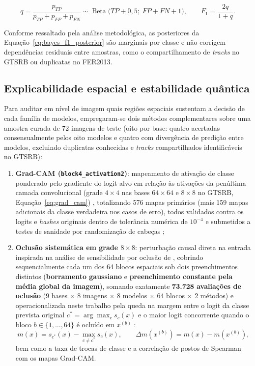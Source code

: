 \documentclass[
    12pt,
    openright,
    oneside,
    a4paper,
    english,
    brazil
]{abntex2}
\begin{document}
\begin{equation}
\label{eq:bayes_f1_posterior}
q = \frac{p_{TP}}{p_{TP} + p_{FP} + p_{FN}} \sim \operatorname{Beta}\bigl(TP + 0{,}5;\; FP + FN + 1\bigr),
\qquad
F_1 = \frac{2q}{1 + q}.
\end{equation}

Conforme ressaltado pela análise metodológica, as posteriores da Equação~\eqref{eq:bayes_f1_posterior} são marginais por classe e não corrigem dependências residuais entre amostras, como o compartilhamento de \textit{tracks} no GTSRB ou duplicatas no FER2013.

\subsection{Explicabilidade espacial e estabilidade quântica}

Para auditar em nível de imagem quais regiões espaciais sustentam a decisão de cada família de modelos, empregaram-se dois métodos complementares sobre uma amostra curada de 72 imagens de teste (oito por base: quatro acertadas consensualmente pelos oito modelos e quatro com divergência de predição entre modelos, excluindo duplicatas conhecidas e \textit{tracks} compartilhados identificáveis no GTSRB):
\begin{enumerate}
    \item \textbf{Grad-CAM (\texttt{block4\_activation2})}: mapeamento de ativação de classe ponderado pelo gradiente do logit-alvo em relação às ativações da penúltima camada convolucional (grade \(4 \times 4\) nas bases \(64 \times 64\) e \(8 \times 8\) no GTSRB, Equação~\eqref{eq:grad_cam}) \cite{selvaraju2020gradcam}, totalizando 576 mapas primários (mais 159 mapas adicionais da classe verdadeira nos casos de erro), todos validados contra os logits e \textit{hashes} originais dentro de tolerância numérica de \(10^{-4}\) e submetidos a testes de sanidade por randomização de cabeças \cite{adebayo2018sanity};
    \item \textbf{Oclusão sistemática em grade \(8 \times 8\)}: perturbação causal direta na entrada inspirada na análise de sensibilidade por oclusão de , cobrindo sequencialmente cada um dos 64 blocos espaciais sob dois preenchimentos distintos (\textbf{borramento gaussiano} e \textbf{preenchimento constante pela média global da imagem}), somando exatamente \textbf{73.728 avaliações de oclusão} (9 bases \(\times\) 8 imagens \(\times\) 8 modelos \(\times\) 64 blocos \(\times\) 2 métodos) e operacionalizada neste trabalho pela queda na margem entre o logit da classe prevista original \(c^* = \arg\max_c s_c(x)\) e o maior logit concorrente quando o bloco \(b \in \{1, \ldots, 64\}\) é ocluído em \(x^{(b)}\) \cite{zeiler2014visualizing}:
    \begin{equation}
    \label{eq:queda_margem_oclusao}
    m(x) = s_{c^*}(x) - \max_{c \neq c^*} s_c(x),
    \qquad
    \Delta m\!\left(x^{(b)}\right) = m(x) - m\!\left(x^{(b)}\right),
    \end{equation}
    bem como a taxa de trocas de classe e a correlação de postos de Spearman com os mapas Grad-CAM.
\end{enumerate}
\end{document}
